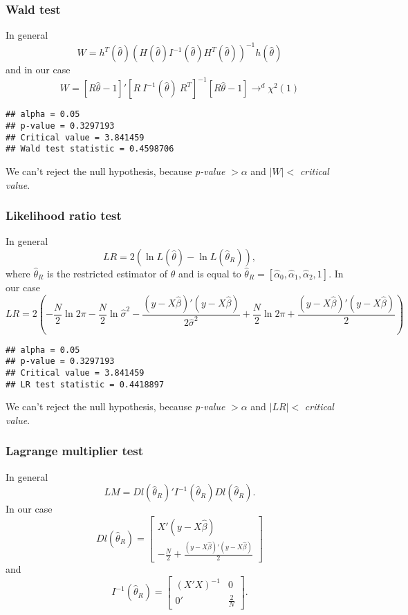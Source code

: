 \documentclass[12pt, a4paper]{article}\usepackage[]{graphicx}\usepackage[]{color}
\makeatletter
\newenvironment{kframe}{%
 \def\at@end@of@kframe{}%
 \ifinner\ifhmode%
  \def\at@end@of@kframe{\end{minipage}}%
  \begin{minipage}{\columnwidth}%
 \fi\fi%
 \def\FrameCommand##1{\hskip\@totalleftmargin \hskip-\fboxsep
 \colorbox{shadecolor}{##1}\hskip-\fboxsep
     \hskip-\linewidth \hskip-\@totalleftmargin \hskip\columnwidth}%
 \MakeFramed {\advance\hsize-\width
   \@totalleftmargin\z@ \linewidth\hsize
   \@setminipage}}%
 {\par\unskip\endMakeFramed%
 \at@end@of@kframe}
\newenvironment{knitrout}{}{} %
\makeatother
\begin{document}
\subsubsection{Wald test}
In general 
\[ W = h^T(\hat{\theta}) \left( H(\hat{\theta}) I^{-1}(\hat{\theta}) H^T(\hat{\theta}) \right)^{-1} h(\hat{\theta}) \]
and in our case
\[ W = [R \hat{\theta} - 1]' \left[ R\ I^{-1}(\hat{\theta})\ R^T \right]^{-1} [R \hat{\theta} -1] \rightarrow^d \chi^2(1) \]
\begin{knitrout}
\color{fgcolor}\begin{kframe}
\begin{verbatim}
## alpha = 0.05
## p-value = 0.3297193
## Critical value = 3.841459
## Wald test statistic = 0.4598706
\end{verbatim}
\end{kframe}
\end{knitrout}
We can't reject the null hypothesis, because \textit{p-value} $> \alpha$ and $|W|<$ \textit{critical value}.



\subsubsection{Likelihood ratio test}
In general 
\[ LR = 2\left( \ln{L(\hat{\theta})} - \ln{L(\hat{\theta}_R)} \right), \]
where $\hat{\theta}_R$ is the restricted estimator of $\theta$ and is equal to $\hat{\theta}_R = \left [\hat{\alpha}_0, \hat{\alpha}_1, \hat{\alpha}_2, 1 \right]$. In our case
\[ LR = 2\left( -\frac{N}{2}\ln{2\pi} - \frac{N}{2}\ln{\hat{\sigma}^2} - \frac{(y-X\hat{\beta})'(y-X\hat{\beta})}{2\hat{\sigma}^2}
                +\frac{N}{2}\ln{2\pi} + \frac{(y-X\hat{\beta})'(y-X\hat{\beta})}{2}
              \right) \]

\begin{knitrout}
\color{fgcolor}\begin{kframe}
\begin{verbatim}
## alpha = 0.05
## p-value = 0.3297193
## Critical value = 3.841459
## LR test statistic = 0.4418897
\end{verbatim}
\end{kframe}
\end{knitrout}
We can't reject the null hypothesis, because \textit{p-value} $> \alpha$ and $|LR|<$ \textit{critical value}.

\subsubsection{Lagrange multiplier test}
In general 
\[ LM = Dl(\hat{\theta}_R)' I^{-1}(\hat{\theta}_R) Dl(\hat{\theta}_R).\]
In our case
\[ Dl(\hat{\theta}_R) = 
  \begin{bmatrix} 
    X'(y-X\hat{\beta}) \\
    -\frac{N}{2} + \frac{(y-X\hat{\beta})'(y-X\hat{\beta})}{2}
  \end{bmatrix}
\]
and 
\[ I^{-1}(\hat{\theta}_R) =
 \begin{bmatrix}
  (X'X)^{-1} & 0 \\
  0' & \frac{2}{N}
 \end{bmatrix}.
\]
\end{document}
